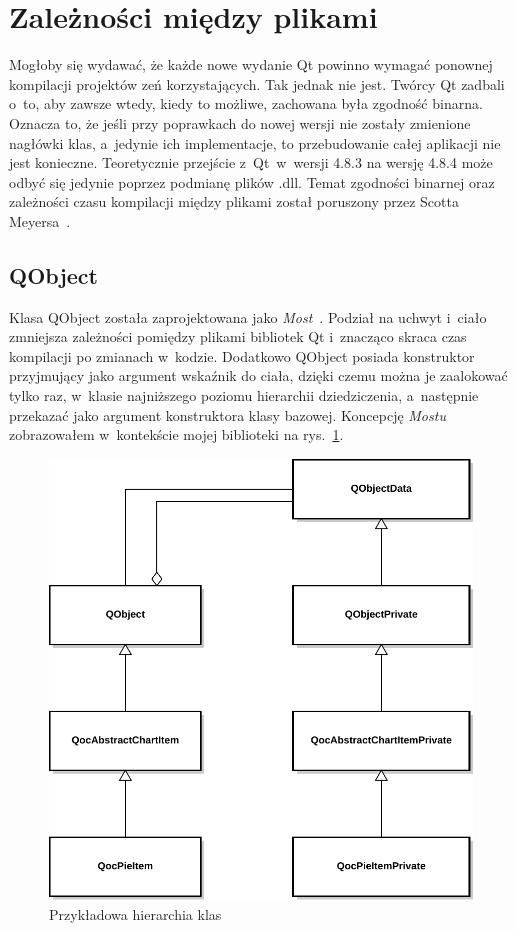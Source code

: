 \section{Zależności między plikami}
Mogłoby się wydawać, że każde nowe wydanie Qt powinno wymagać ponownej kompilacji projektów zeń korzystających. Tak jednak nie jest. Twórcy Qt zadbali o~to, aby zawsze wtedy, kiedy to możliwe, zachowana była zgodność binarna. Oznacza to, że jeśli przy poprawkach do nowej wersji nie zostały zmienione nagłówki klas, a~jedynie ich implementacje, to przebudowanie całej aplikacji nie jest konieczne. Teoretycznie przejście z~Qt~w~wersji 4.8.3 na wersję 4.8.4 może odbyć się jedynie poprzez podmianę plików .dll. Temat zgodności binarnej oraz zależności czasu kompilacji między plikami został poruszony przez Scotta Meyersa~\cite{50Ways}.

\subsection{QObject}
Klasa QObject została zaprojektowana jako \textit{Most}~\cite{Patterns}.
Podział na uchwyt i~ciało zmniejsza zależności pomiędzy plikami bibliotek Qt i~znacząco skraca czas kompilacji po zmianach w~kodzie. Dodatkowo QObject posiada konstruktor przyjmujący jako argument wskaźnik do ciała, dzięki czemu można je zaalokować tylko raz, w~klasie najniższego poziomu hierarchii dziedziczenia, a~następnie przekazać jako argument konstruktora klasy bazowej. 
Koncepcję \textit{Mostu} zobrazowałem w~kontekście mojej biblioteki na rys.~\ref{rys:dpointer}.\newline

\begin{figure}[H]
\centering
\includegraphics[scale=0.8]{img/dpointer.pdf}
\caption{Przykładowa hierarchia klas}\label{rys:dpointer}
\end{figure}

